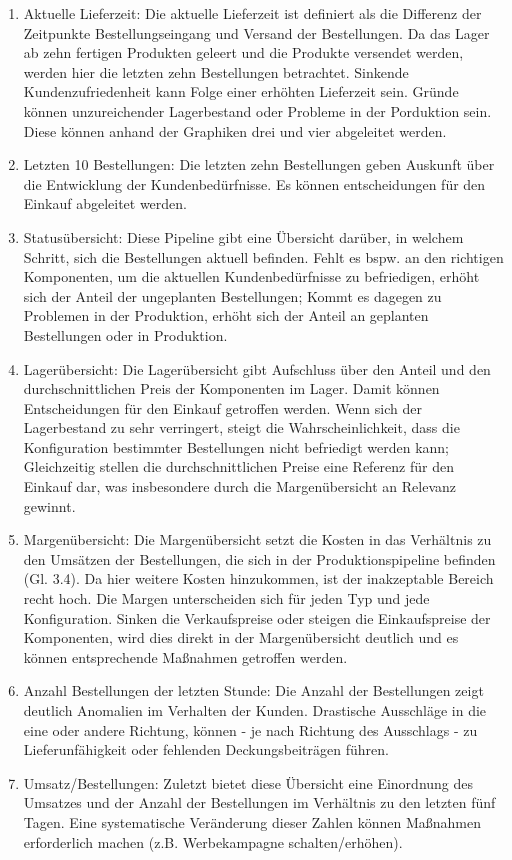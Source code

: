 \begin{enumerate}
    \item Aktuelle Lieferzeit: Die aktuelle Lieferzeit ist definiert als die Differenz der Zeitpunkte Bestellungseingang und Versand der Bestellungen. Da das Lager ab zehn fertigen Produkten geleert und die Produkte versendet werden, werden hier die letzten zehn Bestellungen betrachtet. Sinkende Kundenzufriedenheit kann Folge einer erhöhten Lieferzeit sein. Gründe können unzureichender Lagerbestand oder Probleme in der Porduktion sein. Diese können anhand der Graphiken drei und vier abgeleitet werden.
    \item Letzten 10 Bestellungen: Die letzten zehn Bestellungen geben Auskunft über die Entwicklung der Kundenbedürfnisse. Es können entscheidungen für den Einkauf abgeleitet werden.
    \item Statusübersicht: Diese Pipeline gibt eine Übersicht darüber, in welchem Schritt, sich die Bestellungen aktuell befinden. Fehlt es bspw. an den richtigen Komponenten, um die aktuellen Kundenbedürfnisse zu befriedigen, erhöht sich der Anteil der ungeplanten Bestellungen; Kommt es dagegen zu Problemen in der Produktion, erhöht sich der Anteil an geplanten Bestellungen oder in Produktion.
    \item Lagerübersicht: Die Lagerübersicht gibt Aufschluss über den Anteil und den durchschnittlichen Preis der Komponenten im Lager. Damit können Entscheidungen für den Einkauf getroffen werden. Wenn sich der Lagerbestand zu sehr verringert, steigt die Wahrscheinlichkeit, dass die Konfiguration bestimmter Bestellungen nicht befriedigt werden kann; Gleichzeitig stellen die durchschnittlichen Preise eine Referenz für den Einkauf dar, was insbesondere durch die Margenübersicht an Relevanz gewinnt.
    \item Margenübersicht: Die Margenübersicht setzt die Kosten in das Verhältnis zu den Umsätzen der Bestellungen, die sich in der Produktionspipeline befinden (Gl. 3.4). Da hier weitere Kosten hinzukommen, ist der inakzeptable Bereich recht hoch. Die Margen unterscheiden sich für jeden Typ und jede Konfiguration. Sinken die Verkaufspreise oder steigen die Einkaufspreise der Komponenten, wird dies direkt in der Margenübersicht deutlich und es können entsprechende Maßnahmen getroffen werden.
    \item Anzahl Bestellungen der letzten Stunde: Die Anzahl der Bestellungen zeigt deutlich Anomalien im Verhalten der Kunden. Drastische Ausschläge in die eine oder andere Richtung, können - je nach Richtung des Ausschlags - zu Lieferunfähigkeit oder fehlenden Deckungsbeiträgen führen.
    \item Umsatz/Bestellungen: Zuletzt bietet diese Übersicht eine Einordnung des Umsatzes und der Anzahl der Bestellungen im Verhältnis zu den letzten fünf Tagen. Eine systematische Veränderung dieser Zahlen können Maßnahmen erforderlich machen (z.B. Werbekampagne schalten/erhöhen).
\end{enumerate}

